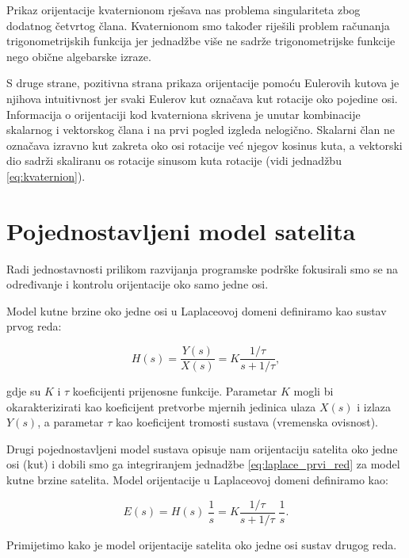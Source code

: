\documentclass[times, utf8, diplomski, numeric]{templates/template}
\begin{document}
{{        Prikaz orijentacije kvaternionom rješava nas problema singulariteta zbog dodatnog četvrtog člana. Kvaternionom smo također riješili problem računanja trigonometrijskih funkcija jer jednadžbe više ne sadrže trigonometrijske funkcije nego obične algebarske izraze.

        S druge strane, pozitivna strana prikaza orijentacije pomoću Eulerovih kutova je njihova intuitivnost jer svaki Eulerov kut označava kut rotacije oko pojedine osi. Informacija o orijentaciji kod kvaterniona skrivena je unutar kombinacije skalarnog i vektorskog člana i na prvi pogled izgleda nelogično. Skalarni član ne označava izravno kut zakreta oko osi rotacije već njegov kosinus kuta, a vektorski dio sadrži skaliranu os rotacije sinusom kuta rotacije (vidi jednadžbu \ref{eq:kvaternion}).
    }

    \section{Pojednostavljeni model satelita}{
    \label{section:pojednostavljeni_model_satelita}
        Radi jednostavnosti prilikom razvijanja programske podrške fokusirali smo se na određivanje i kontrolu orijentacije oko samo jedne osi. 

        Model kutne brzine oko jedne osi u Laplaceovoj domeni definiramo kao sustav prvog reda:

        \begin{equation}
        \label{eq:laplace_prvi_red}
        H(s) = \frac{Y(s)}{X(s)} = K \frac{1/\tau}{s + 1/\tau},
        \end{equation}

        gdje su $K$ i $\tau$ koeficijenti prijenosne funkcije. Parametar $K$ mogli bi okarakterizirati kao koeficijent pretvorbe mjernih jedinica ulaza $X(s)$ i izlaza $Y(s)$, a parametar $\tau$ kao koeficijent tromosti sustava (vremenska ovisnost).

        Drugi pojednostavljeni model sustava opisuje nam orijentaciju satelita oko jedne osi (kut) i dobili smo ga integriranjem jednadžbe \ref{eq:laplace_prvi_red} za model kutne brzine satelita. Model orijentacije u Laplaceovoj domeni definiramo kao:

        \begin{equation}
        \label{eq:laplace_drugi_red}
            E(s) = H(s) \; \frac{1}{s} = K \frac{1/\tau}{s + 1/\tau} \; \frac{1}{s}.
        \end{equation}

        Primijetimo kako je model orijentacije satelita oko jedne osi sustav drugog reda.
    }
}
\end{document}
